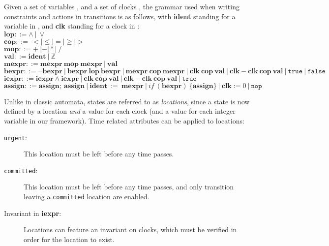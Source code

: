 \begin{definition}
\label{def:formal_methods:transition_grammar2}
Given a set of variables \automatavariables{}, and a set of clocks
\automataclocks{}, the grammar used when writing
constraints and actions in transitions is as follows, with \textbf{ident}
standing for a variable in \automatavariables{}, and \textbf{clk} standing
for a clock in \automataclocks{}:\\
$\textbf{lop} ::= \land~|~\lor $\\
$\textbf{cop} ::=\!\!\! ~< | \le | = | \ge | > $\\
$\textbf{mop} ::= +~| - | * |~/$\\
$
\textbf{val} ::=
   \textbf{ident}
   ~|~ \mathbb{Z}
$\\
$\textbf{mexpr} ::=
   \textbf{mexpr}~\textbf{mop}~\textbf{mexpr}
   ~|~ \textbf{val}
$\\
$
\textbf{bexpr} ::=
   \neg \textbf{bexpr}
   ~|~ \textbf{bexpr}~\textbf{lop}~\textbf{bexpr}
   ~|~ \textbf{mexpr}~\textbf{cop}~\textbf{mexpr}
   ~|~ \textbf{clk}~\textbf{cop}~\textbf{val}
   ~|~ \textbf{clk} - \textbf{clk}~\textbf{cop}~\textbf{val}
   ~|~ \texttt{true}
   ~|~ \texttt{false}
$\\
$\textbf{iexpr} ::=
   \textbf{iexpr} \land \textbf{iexpr}
   ~|~ \textbf{clk}~\textbf{cop}~\textbf{val}
   ~|~ \textbf{clk} - \textbf{clk}~\textbf{cop}~\textbf{val}
   ~|~ \texttt{true}
$\\
$
\textbf{assign} ::=
   \textbf{assign};~\textbf{assign}
   ~|~ \textbf{ident}~:=~\textbf{mexpr}
   ~|~ if~(\textbf{bexpr})~\{\textbf{assign}\}
   ~|~ \textbf{clk} := 0
   ~|~ \texttt{nop}
$
\end{definition}

\begin{definition}[Locations]
Unlike in classic automata, states are referred to as \textit{locations}, since a state is now defined by a location \textit{and} a value for each clock (and a value for each integer variable in our framework).
Time related attributes can be applied to locations:
\begin{description}
\item[\texttt{urgent}:] This location must be left before any time passes.
\item[\texttt{committed}:] This location must be left before any time passes,
and only transition leaving a \texttt{committed} location are enabled.
\item[Invariant in \textbf{iexpr}:] Locations can feature an invariant on
clocks, which must be verified in order for the location to exist.
\end{description}
\end{definition}

